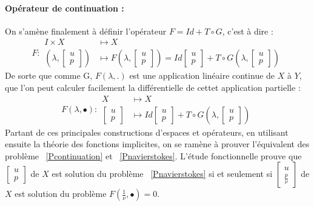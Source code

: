 \documentclass{book}
\begin{document}
\paragraph{Opérateur de continuation :}
On s'amène finalement à définir l'opérateur $F=Id +T \circ G$, c'est à dire :
\[F : 
\begin{array}{rl}
I \times X &\longmapsto X \\
 ( \lambda, \left[\begin{array}{ll}u\\p\end{array}\right] ) &\longmapsto 
 F( \lambda, \left[\begin{array}{ll}u\\p\end{array}\right] )
 =Id\left[\begin{array}{ll}u\\p\end{array}\right] 
 +T\circ G ( \lambda, \left[\begin{array}{ll}u\\p\end{array}\right] ) 
\end{array}
\]
De sorte que comme G, $F(\lambda,.)$ est une application linéaire continue de $X$ à $Y$, que l'on peut calculer facilement la différentielle de cettet application partielle : 
\[F(\lambda,\bullet) : 
\begin{array}{rl}
 X &\longmapsto X \\
 \left[\begin{array}{ll}u\\p\end{array}\right] &\longmapsto 
 Id\left[\begin{array}{ll}u\\p\end{array}\right] 
 +T\circ G ( \lambda, \left[\begin{array}{ll}u\\p\end{array}\right] ) 
\end{array}
\]
Partant de ces principales constructions d'espaces et opérateurs, en utilisant ensuite la théorie des fonctions implicites, on se ramène à prouver l'équivalent des problème ~\eqref{Pcontinuation} et ~\eqref{Pnavierstokes}. L'étude fonctionnelle prouve que $\left[\begin{array}{ll}u\\p\end{array}\right]$ de $X$ est solution du problème ~\eqref{Pnavierstokes} si et seulement si $\left[\begin{array}{ll}u\\ \frac{p}{\nu}\end{array}\right]$ de $X$ est solution du problème $F(\frac{1}{\nu},\bullet)=0$.
\end{document}
